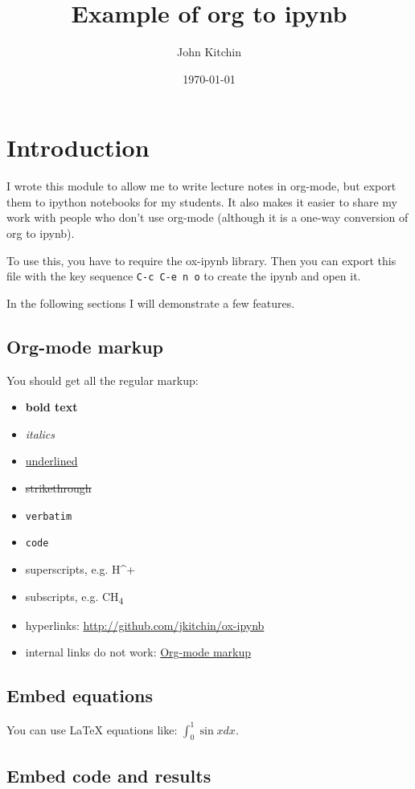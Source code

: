 \documentclass[11pt]{article}
\author{John Kitchin}
\date{\today}
\title{Example of org to ipynb}
\begin{document}
\tableofcontents


\section{Introduction}
\label{sec:org900561c}

I wrote this module to allow me to write lecture notes in org-mode, but export them to ipython notebooks for my students. It also makes it easier to share my work with people who don't use org-mode (although it is a one-way conversion of org to ipynb).

To use this, you have to require the ox-ipynb library. Then you can export this file with the key sequence \texttt{C-c C-e n o} to create the ipynb and open it.

In the following sections I will demonstrate a few features.

\subsection{Org-mode markup}
\label{sec:orgc699949}
You should get all the regular markup:

\begin{itemize}
\item \textbf{bold text}
\item \emph{italics}
\item \uline{underlined}
\item \sout{strikethrough}
\item \texttt{verbatim}
\item \texttt{code}
\item superscripts, e.g. H\^{}+
\item subscripts, e.g. CH\textsubscript{4}
\item hyperlinks: \url{http://github.com/jkitchin/ox-ipynb}
\item internal links do not work: \hyperref[sec:orgc699949]{Org-mode markup}
\end{itemize}

\subsection{Embed equations}
\label{sec:orgd509c05}

You can use \LaTeX{} equations like: \(\int_0^1 \sin x dx\).

\subsection{Embed code and results}
\label{sec:orgcc8d5e7}
\end{document}
